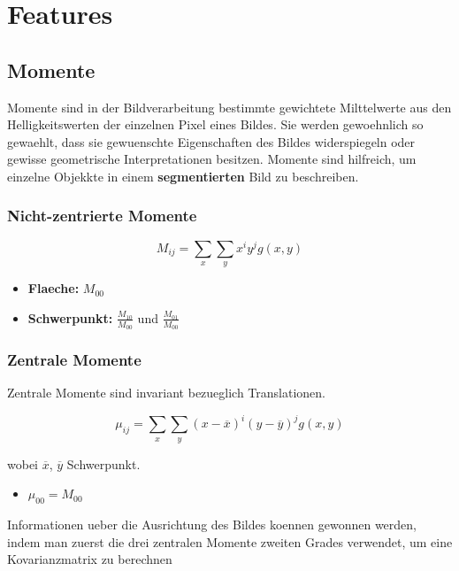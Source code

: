 \section{Features}

\subsection{Momente}

Momente sind in der Bildverarbeitung bestimmte gewichtete Milttelwerte aus den Helligkeitswerten der einzelnen Pixel eines Bildes.
Sie werden gewoehnlich so gewaehlt, dass sie gewuenschte Eigenschaften des Bildes widerspiegeln oder gewisse geometrische Interpretationen besitzen.
Momente sind hilfreich, um einzelne Objekkte in einem \textbf{segmentierten} Bild zu beschreiben.

\subsubsection{Nicht-zentrierte Momente}

\begin{equation}
  M_{ij} = \sum_x \sum_y x^i y^j g(x, y)
\end{equation}

\begin{itemize}
  \item \textbf{Flaeche:} $M_{00}$
  \item \textbf{Schwerpunkt:} $\frac{M_{10}}{M_{00}}$ und $\frac{M_{01}}{M_{00}}$
\end{itemize}

\subsubsection{Zentrale Momente}

Zentrale Momente sind invariant bezueglich Translationen.

\begin{equation}
  \mu_{ij} = \sum_x \sum_y (x - \overline{x})^i (y - \overline{y})^j g(x, y)
\end{equation}

wobei $\overline{x}$, $\overline{y}$ Schwerpunkt.

\begin{itemize}
  \item $\mu_{00} = M_{00}$
\end{itemize}

Informationen ueber die Ausrichtung des Bildes koennen gewonnen werden, indem man zuerst die drei zentralen Momente zweiten Grades verwendet, um eine Kovarianzmatrix zu berechnen

